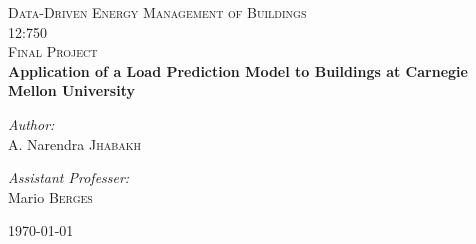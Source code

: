 \documentclass[a4paper,11pt]{article}
\begin{document}
\begin{titlepage}
\begin{center}
\textsc{\LARGE Data-Driven Energy Management of Buildings }\\[0.5cm]
\textsc{\Large 12:750}\\[2.5cm]
\textsc{\LARGE Final Project }\\[1.5cm]
{ \huge \bfseries Application of a  Load Prediction Model to Buildings at Carnegie Mellon University \\[6.4cm] }
\noindent
\begin{minipage}{0.4\textwidth}
\begin{flushleft} \large
\emph{Author:}\\
A. Narendra \textsc{Jhabakh}
\end{flushleft}
\end{minipage}%
\begin{minipage}{0.4\textwidth}
\begin{flushright} \large
\emph{Assistant Professer: } \\
Mario \textsc{Berges}
\end{flushright}
\end{minipage}

\vfill

{\large \today}

\end{center}
\end{titlepage}


\tableofcontents
\newpage
\end{document}
